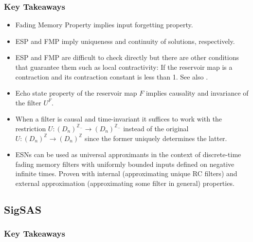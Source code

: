 \documentclass{article}
\begin{document}
\subsubsection{Key Takeaways}

\begin{itemize}
    \item Fading Memory Property implies input forgetting property.
    
    \item ESP and FMP imply uniqueness and continuity of solutions, respectively.
    
    \item ESP and FMP are difficult to check directly but there are other conditions that guarantee them such as local contractivity: If the reservoir map is a contraction and its contraction constant is less than 1. See also \cite{echo_index,Manjunath_2020}.

    \item Echo state property of the reservoir map $F$ implies causality and invariance of the filter $U^F$. 
    
    \item When a filter is causal and time-invariant it suffices to work with the restriction $U:(D_n)^{\mathbb{Z}_-} \rightarrow (D_n)^{\mathbb{Z}_-}$ instead of the original $U:(D_n)^\mathbb{Z} \rightarrow (D_n)^\mathbb{Z}$ since the former uniquely determines the latter.
    
    \item ESNs can be used as universal approximants in the context of discrete-time fading memory filters with uniformly bounded inputs defined on negative infinite times. Proven with internal (approximating unique RC filters) and external approximation (approximating some filter in general) properties.
    
\end{itemize}

\subsection{SigSAS \cite{teichmann}}

\subsubsection{Key Takeaways}
\end{document}
